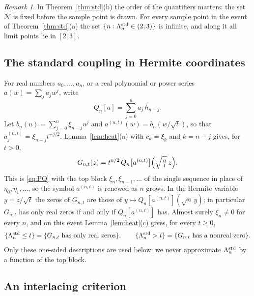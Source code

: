 \documentclass[11pt]{amsart}
\theoremstyle{definition}
\theoremstyle{remark}
\newtheorem{remark}[theorem]{Remark}
\numberwithin{equation}{section}
\begin{document}
\begin{remark}\label{rem:std-quantifier}
In Theorem~\ref{thm:std}(b) the order of the quantifiers matters: the set $\mathcal N$ is fixed before the sample point is drawn. For every sample point in the event of Theorem~\ref{thm:std}(a) the set $\{n:\Lambda_n^{\rm std}\in(2,3)\}$ is infinite, and along it all limit points lie in $[2,3]$.
\end{remark}

\subsection{The standard coupling in Hermite coordinates}
For real numbers $a_0,\dots,a_n$, or a real polynomial or power series $a(w)=\sum_ja_jw^j$, write
\[
Q_n[a]=\sum_{j=0}^{n}a_j\,h_{n-j}.
\]
Let $b_n(u)=\sum_{j=0}^{n}\xi_{n-j}u^j$ and $a^{(n,t)}(w)=b_n(w/\sqrt t)$, so that $a^{(n,t)}_j=\xi_{n-j}t^{-j/2}$. Lemma~\ref{lem:heat}(a) with $c_k=\xi_k$ and $k=n-j$ gives, for $t>0$,
\begin{equation}\label{eq:std-hermite}
G_{n,t}(z)=t^{n/2}\,Q_n\bigl[a^{(n,t)}\bigr]\Bigl(\sqrt{\tfrac nt}\,z\Bigr).
\end{equation}
This is \eqref{eq:PQ} with the top block $\xi_n,\xi_{n-1},\dots$ of the single sequence in place of $\eta_0,\eta_1,\dots$, so the symbol $a^{(n,t)}$ is renewed as $n$ grows. In the Hermite variable $y=z/\sqrt t$ the zeros of $G_{n,t}$ are those of $y\mapsto Q_n[a^{(n,t)}](\sqrt n\,y)$; in particular $G_{n,t}$ has only real zeros if and only if $Q_n[a^{(n,t)}]$ has. Almost surely $\xi_n\ne0$ for every $n$, and on this event Lemma~\ref{lem:heat}(c) gives, for every $t\ge0$,
\begin{equation}\label{eq:std-interval}
\{\Lambda_n^{\rm std}\le t\}=\{G_{n,t}\text{ has only real zeros}\},\qquad\{\Lambda_n^{\rm std}>t\}=\{G_{n,t}\text{ has a nonreal zero}\}.
\end{equation}
Only these one-sided descriptions are used below; we never approximate $\Lambda_n^{\rm std}$ by a function of the top block.

\subsection{An interlacing criterion}
\end{document}
